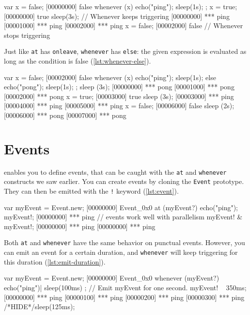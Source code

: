 \begin{urbiscript}[caption=Using \texttt{whenever}, label=lst:whenever]
var x = false;
[00000000] false
whenever (x)
{
  echo("ping");
  sleep(1s);
};
x = true;
[00000000] true
sleep(3s);
// Whenever keeps triggering
[00000000] *** ping
[00001000] *** ping
[00002000] *** ping
x = false;
[00002000] false
// Whenever stops triggering
\end{urbiscript}

Just like \lstinline|at| has \lstinline|onleave|, \lstinline|whenever|
has \lstinline|else|: the given expression is evaluated as long as the
condition is false (\autoref{lst:whenever-else}).

\begin{urbiscript}[caption=Using \texttt{whenever ... else},
  label=lst:whenever-else]
var x = false;
[00002000] false
whenever (x)
{
  echo("ping");
  sleep(1s);
}
else
{
  echo("pong");
  sleep(1s);
};
sleep (3s);
[00000000] *** pong
[00001000] *** pong
[00002000] *** pong
x = true;
[00003000] true
sleep (3s);
[00003000] *** ping
[00004000] *** ping
[00005000] *** ping
x = false;
[00006000] false
sleep (2s);
[00006000] *** pong
[00007000] *** pong
\end{urbiscript}

\section{Events}

\urbi enables you to define events, that can be caught with the
\lstinline|at| and \lstinline|whenever| constructs we saw earlier. You
can create events by cloning the \lstinline|Event| prototype. They can
then be emitted with the \lstinline|!| keyword (\autoref{lst:event}).

\begin{urbiscript}[caption=Using events, label=lst:event]
var myEvent = Event.new;
[00000000] Event_0x0
at (myEvent?)
  echo("ping");
myEvent!;
[00000000] *** ping
// events work well with parallelism
myEvent! & myEvent!;
[00000000] *** ping
[00000000] *** ping
\end{urbiscript}

Both \lstinline|at| and \lstinline|whenever| have the same behavior on
punctual events. However, you can emit an event for a certain
duration, and \lstinline|whenever| will keep triggering for this
duration (\autoref{lst:emit-duration}).

\begin{urbiscript}[caption=Emitting events with a duration,
  label=lst:emit-duration]
var myEvent = Event.new;
[00000000] Event_0x0
whenever (myEvent?)
{
  echo("ping")|
  sleep(100ms)
};
// Emit myEvent for one second.
myEvent! ~ 350ms;
[00000000] *** ping
[00000100] *** ping
[00000200] *** ping
[00000300] *** ping
/*HIDE*/sleep(125ms);
\end{urbiscript}

